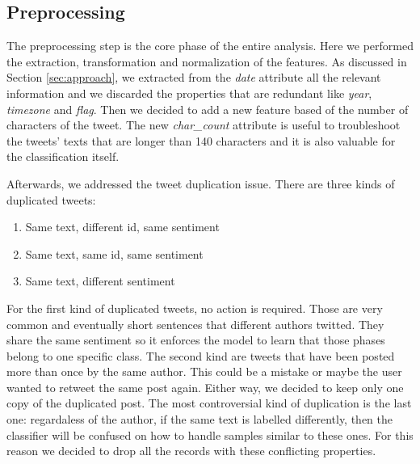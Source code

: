 \documentclass[conference]{IEEEtran}
\begin{document}
\subsection{Preprocessing}\label{sec:preprocessing}
The preprocessing step is the core phase of the entire analysis. Here we performed the extraction, transformation and normalization of the features. As discussed in Section \ref{sec:approach}, we extracted from the \textit{date} attribute all the relevant information and we discarded the properties that are redundant like \textit{year}, \textit{timezone} and \textit{flag}. Then we decided to add a new feature based of the number of characters of the tweet. The new \textit{char\_count} attribute is useful to troubleshoot the tweets' texts that are longer than 140 characters and it is also valuable for the classification itself.

Afterwards, we addressed the tweet duplication issue. There are three kinds of duplicated tweets:
\begin{enumerate}
    \item Same text, different id, same sentiment
    \item Same text, same id, same sentiment
    \item Same text, different sentiment
\end{enumerate}
For the first kind of duplicated tweets, no action is required. Those are very common and eventually short sentences that different authors twitted. They share the same sentiment so it enforces the model to learn that those phases belong to one specific class. The second kind are tweets that have been posted more than once by the same author. This could be a mistake or maybe the user wanted to retweet the same post again. Either way, we decided to keep only one copy of the duplicated post. The most controversial kind of duplication is the last one: regardaless of the author, if the same text is labelled differently, then the classifier will be confused on how to handle samples similar to these ones. For this reason we decided to drop all the records with these conflicting properties.
\end{document}
